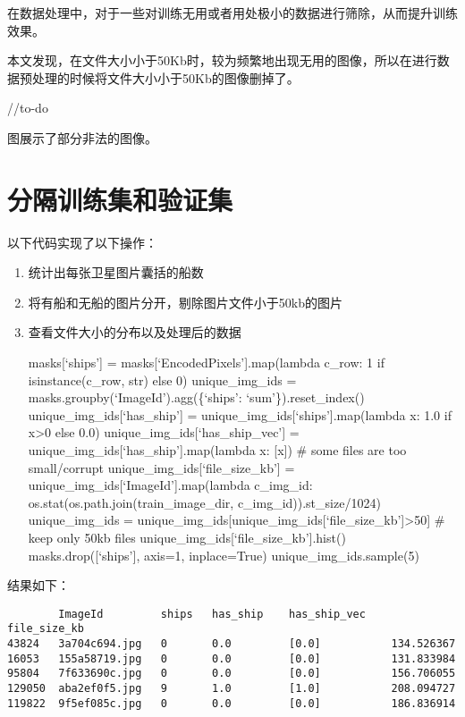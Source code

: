 在数据处理中，对于一些对训练无用或者用处极小的数据进行筛除，从而提升训练效果。

本文发现，在文件大小小于50Kb时，较为频繁地出现无用的图像，所以在进行数据预处理的时候将文件大小小于50Kb的图像删掉了。

//to-do

图展示了部分非法的图像。

\section{分隔训练集和验证集}

以下代码实现了以下操作：

\begin{enumerate}
\def\labelenumi{\arabic{enumi}.}
\item
  统计出每张卫星图片囊括的船数
\item
  将有船和无船的图片分开，剔除图片文件小于50kb的图片
\item
  查看文件大小的分布以及处理后的数据

  masks{[}`ships'{]} = masks{[}`EncodedPixels'{]}.map(lambda c\_row: 1
  if isinstance(c\_row, str) else 0) unique\_img\_ids =
  masks.groupby(`ImageId').agg(\{`ships': `sum'\}).reset\_index()
  unique\_img\_ids{[}`has\_ship'{]} =
  unique\_img\_ids{[}`ships'{]}.map(lambda x: 1.0 if x\textgreater{}0
  else 0.0) unique\_img\_ids{[}`has\_ship\_vec'{]} =
  unique\_img\_ids{[}`has\_ship'{]}.map(lambda x: {[}x{]}) \# some files
  are too small/corrupt unique\_img\_ids{[}`file\_size\_kb'{]} =
  unique\_img\_ids{[}`ImageId'{]}.map(lambda c\_img\_id:
  os.stat(os.path.join(train\_image\_dir, c\_img\_id)).st\_size/1024)
  unique\_img\_ids =
  unique\_img\_ids{[}unique\_img\_ids{[}`file\_size\_kb'{]}\textgreater{}50{]}
  \# keep only 50kb files unique\_img\_ids{[}`file\_size\_kb'{]}.hist()
  masks.drop({[}`ships'{]}, axis=1, inplace=True)
  unique\_img\_ids.sample(5)
\end{enumerate}

结果如下：

\begin{verbatim}
        ImageId         ships   has_ship    has_ship_vec    file_size_kb
43824   3a704c694.jpg   0       0.0         [0.0]           134.526367
16053   155a58719.jpg   0       0.0         [0.0]           131.833984
95804   7f633690c.jpg   0       0.0         [0.0]           156.706055
129050  aba2ef0f5.jpg   9       1.0         [1.0]           208.094727
119822  9f5ef085c.jpg   0       0.0         [0.0]           186.836914
\end{verbatim}

